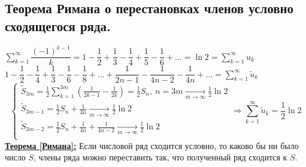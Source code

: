 \documentclass[a4paper,12pt]{article} %
\newcommand{\series}{\sum\limits_{k=1}^{\infty}}
\newcommand{\useries}{\sum\limits_{k=1}^{\infty} u_k}
\begin{document}
\subsection{Теорема Римана о перестановках членов условно сходящегося ряда.}
$\series \dfrac{(-1)^{k-1}}{k} = 1 - \dfrac{1}{2} + \dfrac{1}{3} - \dfrac{1}{4} + \dfrac{1}{5} - \dfrac{1}{6} + \ldots = \ln 2 = \useries$
$1 - \dfrac{1}{2} - \dfrac{1}{4} + \dfrac{1}{3} - \dfrac{1}{6} - \dfrac{1}{8} + \ldots + \dfrac{1}{2n-1} - \dfrac{1}{4n-2} - \dfrac{1}{4n} + \ldots = \sum\limits_{k=1}^{\infty} \tilde{u}_k$
\begin{equation*}
	\begin{cases}
		\tilde{S}_{3m} = \frac{1}{2} \sum\limits_{k=1}^{3m}\left( \frac{1}{2k-1} - \frac{1}{2k} \right) = \frac{1}{2} S_{n}, \ n=3m \xrightarrow[m \to \infty]{} \frac{1}{2} \ln 2\\
		\tilde{S}_{3m - 1} = \frac{1}{2} S_n + \frac{1}{4n} \xrightarrow[m \to \infty]{} \frac{1}{2} \ln 2 \\
		\tilde{S}_{3m - 2} = \frac{1}{2} S_n + \frac{1}{4n} + \frac{1}{4n-2} \xrightarrow[m \to \infty]{} \frac{1}{2} \ln 2 \\
	\end{cases}
	\Rightarrow \sum\limits_{k=1}^{\infty} \tilde{u}_k = \dfrac{1}{2} \ln 2
\end{equation*}
\underline{\textbf{Теорема [Римана]:}}
Если числовой ряд сходится условно, то каково бы ни было число $S$, члены ряда можно переставить так, что полученный ряд сходится к $S$.
\end{document}
